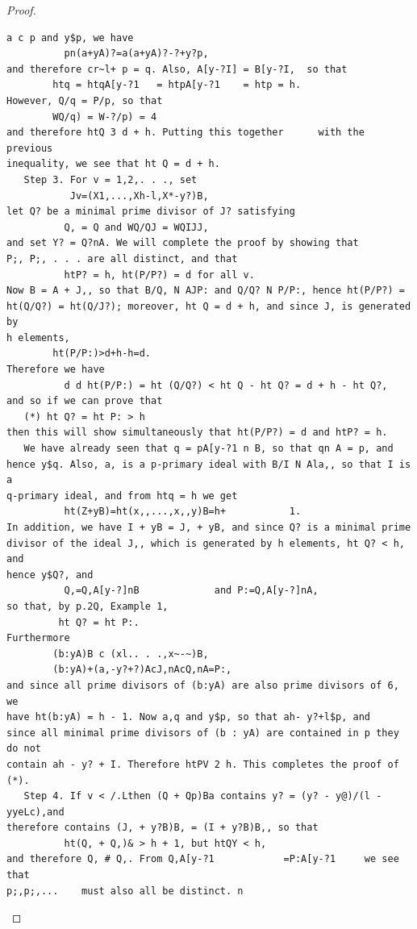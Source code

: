 \begin{proof}
\begin{verbatim}
a c p and y$p, we have
          pn(a+yA)?=a(a+yA)?-?+y?p,
and therefore cr~l+ p = q. Also, A[y-?I] = B[y-?I,  so that
        htq = htqA[y-?1   = htpA[y-?1    = htp = h.
However, Q/q = P/p, so that
        WQ/q) = W-?/p) = 4
and therefore htQ 3 d + h. Putting this together      with the previous
inequality, we see that ht Q = d + h.
   Step 3. For v = 1,2,. . ., set
           Jv=(X1,...,Xh-l,X*-y?)B,
let Q? be a minimal prime divisor of J? satisfying
          Q, = Q and WQ/QJ = WQIJJ,
and set Y? = Q?nA. We will complete the proof by showing that
P;, P;, . . . are all distinct, and that
          htP? = h, ht(P/P?) = d for all v.
Now B = A + J,, so that B/Q, N AJP: and Q/Q? N P/P:, hence ht(P/P?) =
ht(Q/Q?) = ht(Q/J?); moreover, ht Q = d + h, and since J, is generated by
h elements,
        ht(P/P:)>d+h-h=d.
Therefore we have
          d d ht(P/P:) = ht (Q/Q?) < ht Q - ht Q? = d + h - ht Q?,
and so if we can prove that
   (*) ht Q? = ht P: > h
then this will show simultaneously that ht(P/P?) = d and htP? = h.
   We have already seen that q = pA[y-?1 n B, so that qn A = p, and
hence y$q. Also, a, is a p-primary ideal with B/I N Ala,, so that I is a
q-primary ideal, and from htq = h we get
          ht(Z+yB)=ht(x,,...,x,,y)B=h+           1.
In addition, we have I + yB = J, + yB, and since Q? is a minimal prime
divisor of the ideal J,, which is generated by h elements, ht Q? < h, and
hence y$Q?, and
          Q,=Q,A[y-?]nB             and P:=Q,A[y-?]nA,
so that, by p.2Q, Example 1,
         ht Q? = ht P:.
Furthermore
        (b:yA)B c (xl.. . .,x~-~)B,
        (b:yA)+(a,-y?+?)AcJ,nAcQ,nA=P:,
and since all prime divisors of (b:yA) are also prime divisors of 6, we
have ht(b:yA) = h - 1. Now a,q and y$p, so that ah- y?+l$p, and
since all minimal prime divisors of (b : yA) are contained in p they do not
contain ah - y? + I. Therefore htPV 2 h. This completes the proof of (*).
   Step 4. If v < /.Lthen (Q + Qp)Ba contains y? = (y? - y@)/(l - yyeLc),and
therefore contains (J, + y?B)B, = (I + y?B)B,, so that
          ht(Q, + Q,)& > h + 1, but htQY < h,
and therefore Q, # Q,. From Q,A[y-?1            =P:A[y-?1     we see that
p;,p;,...    must also all be distinct. n
\end{verbatim}
\end{proof}


